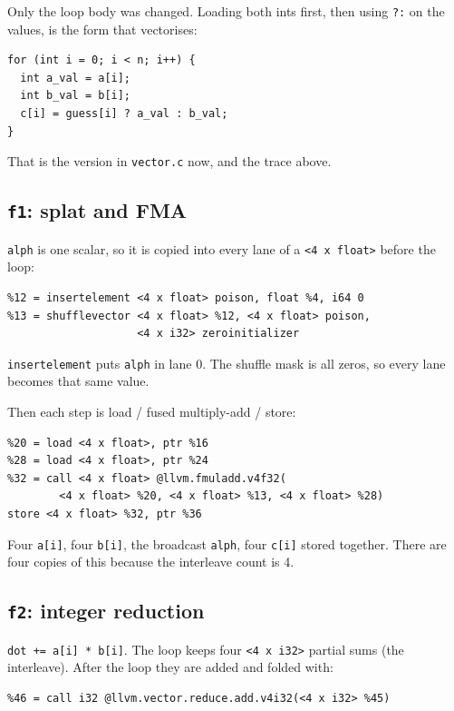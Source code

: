\documentclass[11pt,a4paper]{article}
\begin{document}
Only the loop body was changed. Loading both ints first, then using
\texttt{?:} on the values, is the form that vectorises:

\begin{lstlisting}[language={}]
for (int i = 0; i < n; i++) {
  int a_val = a[i];
  int b_val = b[i];
  c[i] = guess[i] ? a_val : b_val;
}
\end{lstlisting}

That is the version in \texttt{vector.c} now, and the trace above.

\subsection*{\texttt{f1}: splat and FMA}

\texttt{alph} is one scalar, so it is copied into every lane of a
\texttt{<4 x float>} before the loop:

\begin{lstlisting}
%12 = insertelement <4 x float> poison, float %4, i64 0
%13 = shufflevector <4 x float> %12, <4 x float> poison,
                    <4 x i32> zeroinitializer
\end{lstlisting}

\texttt{insertelement} puts \texttt{alph} in lane 0. The shuffle mask
is all zeros, so every lane becomes that same value.

Then each step is load / fused multiply-add / store:

\begin{lstlisting}
%20 = load <4 x float>, ptr %16
%28 = load <4 x float>, ptr %24
%32 = call <4 x float> @llvm.fmuladd.v4f32(
        <4 x float> %20, <4 x float> %13, <4 x float> %28)
store <4 x float> %32, ptr %36
\end{lstlisting}

Four \texttt{a[i]}, four \texttt{b[i]}, the broadcast \texttt{alph},
four \texttt{c[i]} stored together. There are four copies of this
because the interleave count is 4.

\subsection*{\texttt{f2}: integer reduction}

\texttt{dot += a[i] * b[i]}. The loop keeps four \texttt{<4 x i32>}
partial sums (the interleave). After the loop they are added and
folded with:

\begin{lstlisting}
%46 = call i32 @llvm.vector.reduce.add.v4i32(<4 x i32> %45)
\end{lstlisting}
\end{document}
